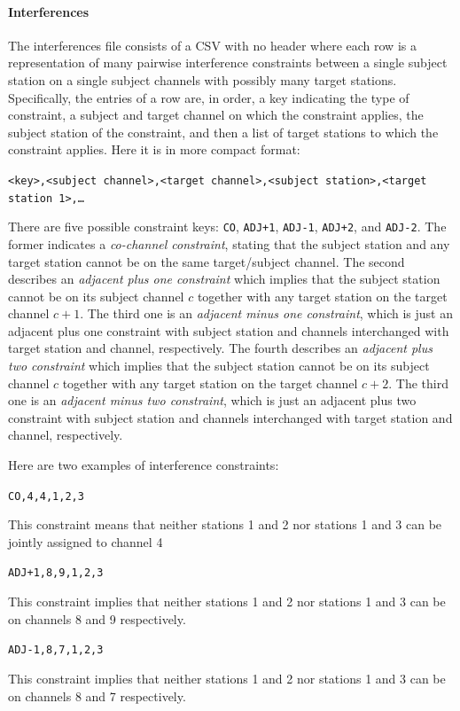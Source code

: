 \documentclass[
10pt, %
letterpaper, %
oneside, %
headinclude,footinclude, %
BCOR5mm, %
needspace, %
]{scrartcl}
\begin{document}
\paragraph{Interferences} The interferences file consists of a CSV with no header where each row is a representation of many pairwise interference constraints between a single subject station on a single subject channels with possibly many target stations. Specifically, the entries of a row are, in order, a key indicating the type of constraint, a subject and target channel on which the constraint applies, the subject station of the constraint, and then a list of target stations to which the constraint applies. Here it is in more compact format:
\begin{center}
    \texttt{<key>,<subject channel>,<target channel>,<subject station>,<target station 1>,\ldots}
\end{center}
There are five possible constraint keys: \texttt{CO}, \texttt{ADJ+1}, \texttt{ADJ-1}, \texttt{ADJ+2}, and \texttt{ADJ-2}. The former indicates a \emph{co-channel constraint}, stating that the subject station and any target station cannot be on the same target/subject channel. The second describes an \emph{adjacent plus one constraint} which implies that the subject station cannot be on its subject channel $c$ together with any target station on the target channel $c+1$. The third one is an \emph{adjacent minus one constraint}, which is just an adjacent plus one constraint with subject station and channels interchanged with target station and channel, respectively. The fourth describes an \emph{adjacent plus two constraint} which implies that the subject station cannot be on its subject channel $c$ together with any target station on the target channel $c+2$. The third one is an \emph{adjacent minus two constraint}, which is just an adjacent plus two constraint with subject station and channels interchanged with target station and channel, respectively.

Here are two examples of interference constraints:
\begin{center}
    \texttt{CO,4,4,1,2,3}
\end{center}
This constraint means that neither stations 1 and 2 nor stations 1 and 3 can be jointly assigned to channel 4
\begin{center}
    \texttt{ADJ+1,8,9,1,2,3}
\end{center}
This constraint implies that neither stations 1 and 2 nor stations 1 and 3 can be on channels 8 and 9 respectively.
\begin{center}
    \texttt{ADJ-1,8,7,1,2,3}
\end{center}
This constraint implies that neither stations 1 and 2 nor stations 1 and 3 can be on channels 8 and 7 respectively.
\end{document}
